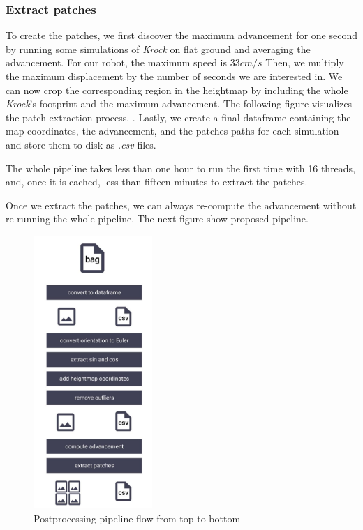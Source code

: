 \documentclass[../document.tex]{subfiles}
\begin{document}
\subsubsection{Extract patches}
To create the patches, we first discover the maximum advancement for one second by running some simulations of \emph{Krock} on flat ground and averaging the advancement. For our robot, the maximum speed is $33cm/s$ Then, we multiply the maximum displacement by the number of seconds we are interested in. We can now crop the corresponding region in the heightmap by including the whole \emph{Krock}'s footprint and the maximum advancement. The following figure visualizes the patch extraction process. 
. Lastly, we create a final dataframe containing the map coordinates, the advancement, and the patches paths for each simulation and store them to disk as \emph{.csv} files. 

The whole pipeline takes less than one hour to run the first time with 16 threads, and, once it is cached, less than fifteen minutes to extract the patches. 

Once we extract the patches, we can always re-compute the advancement without re-running the whole pipeline. The next figure show proposed pipeline.
\begin{figure}[H] 
\centering
\includegraphics[width=0.4\textwidth]{../img/postprocessing-pipeline.jpg}
\caption{Postprocessing pipeline flow from top to bottom}
\label{fig: postprocessing-pipeline}
\end{figure}
\end{document}
